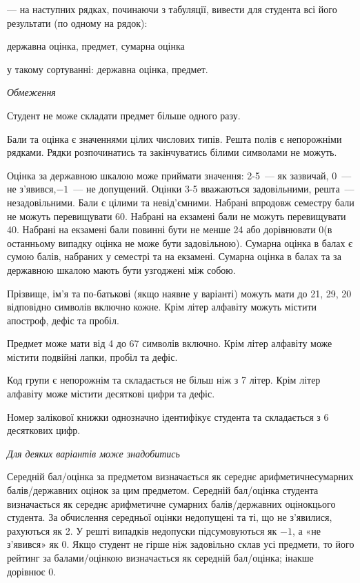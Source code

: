 \documentclass[11pt, ukrainian]{article}
\begin{document}
{\noindent}--- на наступних рядках, починаючи з табуляції, вивести для студента всі його результати (по одному на рядок):\par
державна оцінка, предмет, сумарна оцінка

{\noindent}у такому сортуванні: державна оцінка, предмет.


\bigskip\textit{Обмеження}

Студент не може складати предмет більше одного разу.

Бали та оцінка є значеннями цілих числових типів. Решта полів є непорожніми рядками.
Рядки розпочинатись та закінчуватись білими символами не можуть.

Оцінка за державною шкалою може приймати значення: 2-5~--- як зазвичай, 0~--- не з’явився,$-1$~--- не допущений. 
Оцінки 3-5 вважаються задовільними, решта~--- незадовільними. 
Бали є цілими та невід’ємними.
Набрані впродовж семестру бали не можуть перевищувати 60. 
Набрані на екзамені бали не можуть перевищувати 40. 
Набрані на екзамені бали повинні бути не менше 24 або дорівнювати 0(в останньому випадку оцінка не може бути задовільною). 
Сумарна оцінка в балах є сумою балів, набраних у семестрі та на екзамені.
Сумарна оцінка в балах та за державною шкалою мають бути узгоджені між собою.

Прізвище, ім’я та по-батькові (якщо наявне у варіанті) можуть мати до 21, 29, 20 відповідно символів включно кожне. 
Крім літер алфавіту можуть містити апостроф, дефіс та пробіл.

Предмет може мати від 4 до 67 символів включно. 
Крім літер алфавіту може містити подвійні лапки, пробіл та дефіс.

Код групи є непорожнім та складається не більш ніж з 7 літер. 
Крім літер алфавіту може містити десяткові цифри та дефіс.


Номер залікової книжки однозначно ідентифікує студента та складається з 6 десяткових цифр. 

\bigskip\textit{Для деяких варіантів може знадобитись}

Середній бал/оцінка за предметом визначається як середнє арифметичнесумарних балів/державних оцінок за цим предметом. 
Середній бал/оцінка студента визначається як середнє арифметичне сумарних балів/державних оцінокцього студента. 
За обчислення середньої оцінки недопущені та ті, що не з’явилися, рахуються як 2.
У решті випадків недопуски підсумовуються як $-1$, а «не з’явився» як 0.
Якщо студент не гірше ніж задовільно склав усі предмети, 
то його рейтинг за балами/оцінкою визначається як середній бал/оцінка; інакше дорівнює 0.
\end{document}
